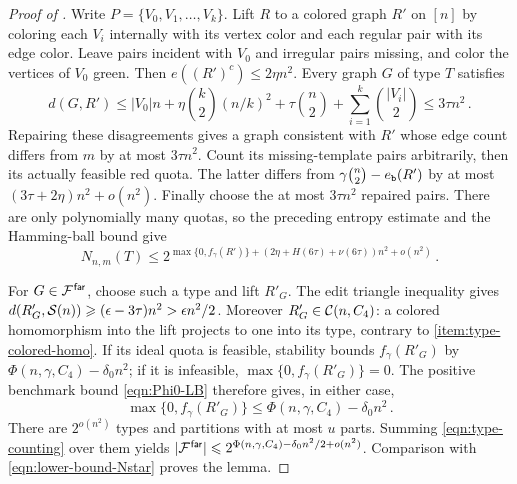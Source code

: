 \begin{proof}[Proof of ]
Write $P=\{V_0,V_1,\dots,V_k\}$. Lift $R$ to a colored graph $R'$ on $[n]$ by coloring each $V_i$ internally with its vertex color and each regular pair with its edge color. Leave pairs incident with $V_0$ and irregular pairs missing, and color the vertices of $V_0$ green. Then $e((R')^c)\leq2\eta n^2$. Every graph $G$ of type $T$ satisfies
$$d(G,R')\leq |V_0|n+\eta\binom{k}{2}(n/k)^2+\tau\binom{n}{2}+\sum_{i=1}^k\binom{|V_i|}{2}\leq3\tau n^2\,.$$
Repairing these disagreements gives a graph consistent with $R'$ whose edge count differs from $m$ by at most $3\tau n^2$. Count its missing-template pairs arbitrarily, then its actually feasible red quota. The latter differs from $\gamma\binom{n}{2}-e_{\normalfont\texttt b}(R')$ by at most $(3\tau+2\eta)n^2+o(n^2)$. Finally choose the at most $3\tau n^2$ repaired pairs. There are only polynomially many quotas, so the preceding entropy estimate and the Hamming-ball bound give
\begin{equation}\label{eqn:type-counting}
N_{n,m}(T)\leq2^{\max\{0,f_\gamma(R')\}+(2\eta+H(6\tau)+\nu(6\tau))n^2+o(n^2)}\,.
\end{equation}

For $G\in{\mathcal F}^{\hspace{0.2mm}\mathsf{far}}$, choose such a type and lift $R'_G$. The edit triangle inequality gives $d(R'_G,{\mathcal S}(n))\geqslant(\epsilon-3\tau)n^2>\epsilon n^2/2$. Moreover $R'_G\in{\mathcal C}(n,C_4)$: a colored homomorphism into the lift projects to one into its type, contrary to  \ref{item:type-colored-homo}. If its ideal quota is feasible, stability bounds $f_\gamma(R'_G)$ by $\Phi(n,\gamma,C_4)-\delta_0n^2$; if it is infeasible, $\max\{0,f_\gamma(R'_G)\}=0$. The positive benchmark bound \eqref{eqn:Phi0-LB} therefore gives, in either case,
\begin{equation}\label{eqn:entropy-gap}
\max\{0,f_\gamma(R'_G)\}\leq\Phi(n,\gamma,C_4)-\delta_0n^2\,.
\end{equation}
There are $2^{o(n^2)}$ types and partitions with at most $u$ parts. Summing \eqref{eqn:type-counting} over them yields $|{\mathcal F}^{\hspace{0.2mm}\mathsf{far}}|\leqslant2^{\Phi(n,\gamma,C_4)-\delta_0n^2/2+o(n^2)}$. Comparison with \eqref{eqn:lower-bound-Nstar} proves the lemma.
\end{proof}

